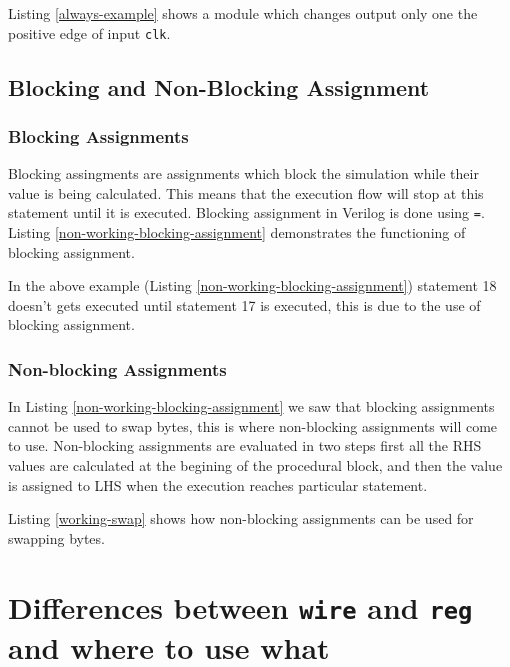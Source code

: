 \documentclass[a4paper,10pt]{article}
\theoremstyle{mytheor}
\newcommand{
  \insertverilog}[3]{
  
}
\begin{document}
Listing \ref{always-example} shows a module which changes output only
one the positive edge of input
\lstinline[style=verilog-inline-style]{clk}. 

\insertverilog{./verilog_files/alwaysExample.v}{always-example}{Synchronous logic which changes value of result only at the positive edge of clk.} 
 
\subsection{Blocking and Non-Blocking Assignment}
\subsubsection{Blocking Assignments}
Blocking assingments are assignments which block the simulation while
their value is being calculated. This means that the execution flow
will stop at this statement until it is executed. Blocking assignment
in Verilog is done using
\lstinline[style=verilog-inline-style]{=}. Listing
\ref{non-working-blocking-assignment} demonstrates the functioning of
blocking assignment.

\insertverilog{./verilog_files/nonWorkingSwap.v}{non-working-blocking-assignment}{Swapping bytes using blocking assignment.}  

In the above example (Listing \ref{non-working-blocking-assignment})
statement 18 doesn't gets executed until statement 17 is executed,
this is due to the use of blocking assignment.

\subsubsection{Non-blocking Assignments} 
In Listing \ref{non-working-blocking-assignment} we saw that blocking
assignments cannot be used to swap bytes, this is where non-blocking
assignments will come to use. Non-blocking assignments are evaluated
in two steps first all the RHS values are calculated at the begining
of the procedural block, and then the value is assigned to LHS when
the execution reaches particular statement.

Listing \ref{working-swap} shows how non-blocking assignments can be
used for swapping bytes.

\insertverilog{./verilog_files/workingSwap.v}{working-swap}{Swapping bytes using non-blocking assignment\, it works!}   

\section{Differences between \lstinline[style=verilog-inline-style]{wire} and \lstinline[style=verilog-inline-style]{reg} and where to use what}
\end{document}
